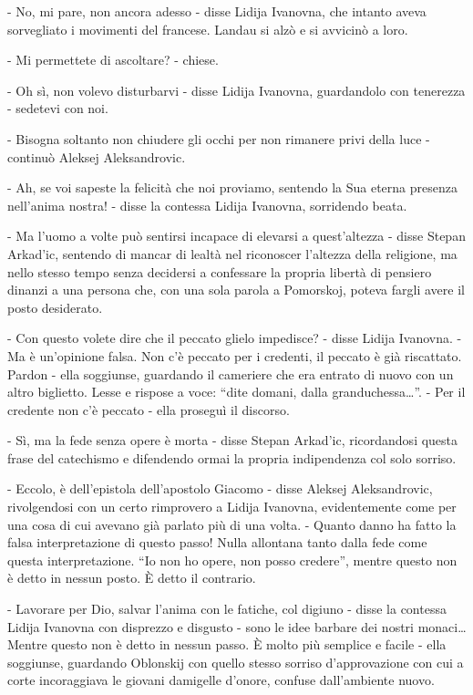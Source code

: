 - No, mi pare, non ancora adesso - disse Lidija Ivanovna, che intanto aveva sorvegliato i movimenti del francese. Landau si alzò e si avvicinò a loro. 

- Mi permettete di ascoltare? - chiese. 

- Oh sì, non volevo disturbarvi - disse Lidija Ivanovna, guardandolo con tenerezza - sedetevi con noi. 

- Bisogna soltanto non chiudere gli occhi per non rimanere privi della luce - continuò Aleksej Aleksandrovic. 

- Ah, se voi sapeste la felicità che noi proviamo, sentendo la Sua eterna presenza nell'anima nostra! - disse la contessa Lidija Ivanovna, sorridendo beata. 

- Ma l'uomo a volte può sentirsi incapace di elevarsi a quest'altezza - disse Stepan Arkad'ic, sentendo di mancar di lealtà nel riconoscer l'altezza della religione, ma nello stesso tempo senza decidersi a confessare la propria libertà di pensiero dinanzi a una persona che, con una sola parola a Pomorskoj, poteva fargli avere il posto desiderato. 

- Con questo volete dire che il peccato glielo impedisce? - disse Lidija Ivanovna. - Ma è un'opinione falsa. Non c'è peccato per i credenti, il peccato è già riscattato. Pardon - ella soggiunse, guardando il cameriere che era entrato di nuovo con un altro biglietto. Lesse e rispose a voce: ``dite domani, dalla granduchessa\ldots{}''. - Per il credente non c'è peccato - ella proseguì il discorso. 

- Sì, ma la fede senza opere è morta - disse Stepan Arkad'ic, ricordandosi questa frase del catechismo e difendendo ormai la propria indipendenza col solo sorriso. 

- Eccolo, è dell'epistola dell'apostolo Giacomo - disse Aleksej Aleksandrovic, rivolgendosi con un certo rimprovero a Lidija Ivanovna, evidentemente come per una cosa di cui avevano già parlato più di una volta. - Quanto danno ha fatto la falsa interpretazione di questo passo! Nulla allontana tanto dalla fede come questa interpretazione. ``Io non ho opere, non posso credere'', mentre questo non è detto in nessun posto. È detto il contrario. 

- Lavorare per Dio, salvar l'anima con le fatiche, col digiuno - disse la contessa Lidija Ivanovna con disprezzo e disgusto - sono le idee barbare dei nostri monaci\ldots{} Mentre questo non è detto in nessun passo. È molto più semplice e facile - ella soggiunse, guardando Oblonskij con quello stesso sorriso d'approvazione con cui a corte incoraggiava le giovani damigelle d'onore, confuse dall'ambiente nuovo. 


